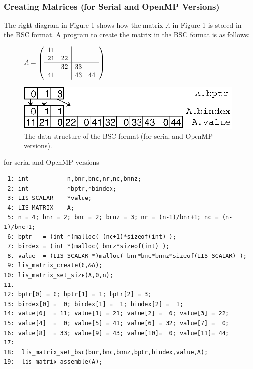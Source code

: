 \documentclass[a4paper]{article}
\begin{document}
\subsubsection{Creating Matrices (for Serial and OpenMP Versions)}
The right diagram in Figure \ref{fig:storage08} shows how the matrix $A$ in Figure \ref{fig:storage08} is stored in the BSC format. A program to create the matrix in the BSC format is as follows:
\begin{figure}[h]
{\centering 
\begin{minipage}{0.3\textwidth}
\begin{flushright}
$ 
A = \left(
\begin{array}{cc|cc}
11 &    &    &    \\
21 & 22 &    &    \\ \hline
   & 32 & 33 &    \\
41 &    & 43 & 44 \\
\end{array}\right)
$
\end{flushright}
\end{minipage}
\begin{minipage}{0.6\textwidth}
\begin{flushleft}
\includegraphics{storage08.eps} 
\end{flushleft}
\end{minipage}
\caption{The data structure of the BSC format (for serial and OpenMP versions).}\label{fig:storage08}}
\end{figure}
\begin{itembox}[l]{for serial and OpenMP versions}
\small
\begin{verbatim}
 1: int           n,bnr,bnc,nr,nc,bnnz;
 2: int           *bptr,*bindex;
 3: LIS_SCALAR    *value;
 4: LIS_MATRIX    A;
 5: n = 4; bnr = 2; bnc = 2; bnnz = 3; nr = (n-1)/bnr+1; nc = (n-1)/bnc+1;
 6: bptr   = (int *)malloc( (nc+1)*sizeof(int) );
 7: bindex = (int *)malloc( bnnz*sizeof(int) );
 8: value  = (LIS_SCALAR *)malloc( bnr*bnc*bnnz*sizeof(LIS_SCALAR) );
 9: lis_matrix_create(0,&A);
10: lis_matrix_set_size(A,0,n);
11:
12: bptr[0] = 0; bptr[1] = 1; bptr[2] = 3;
13: bindex[0] =  0; bindex[1] =  1; bindex[2] =  1;
14: value[0]  = 11; value[1] = 21; value[2] =  0; value[3] = 22;
15: value[4]  =  0; value[5] = 41; value[6] = 32; value[7] =  0;
16: value[8]  = 33; value[9] = 43; value[10]=  0; value[11]= 44;
17:
18:  lis_matrix_set_bsc(bnr,bnc,bnnz,bptr,bindex,value,A);
19:  lis_matrix_assemble(A);
\end{verbatim}
\end{itembox}
\newpage
\end{document}

